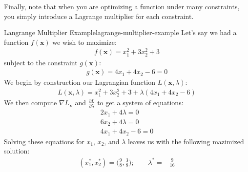 
Finally, note that when you are optimizing a function under many constraints, you simply introduce a Lagrange multiplier for each constraint.

\begin{example}{Langrange Multiplier Example}{lagrange-multiplier-example}
	Let's say we had a function $f(\textbf{x})$ we wish to maximize:
	\begin{align*}
		f(\textbf{x}) = x_{1}^{2} + 3x_{2}^{2} + 3
	\end{align*}
	subject to the constraint $g(\textbf{x})$:
	\begin{align*}
		g(\textbf{x}) = 4x_{1} + 4x_{2} - 6 = 0
	\end{align*}
	We begin by construction our Lagrangian function $L(\textbf{x}, \lambda)$:
	\begin{align*}
		L(\textbf{x}, \lambda) = x_{1}^{2} + 3x_{2}^{2} + 3 + \lambda (4x_{1} + 4x_{2} - 6)
	\end{align*}
	We then compute $\nabla L_{\textbf{x}}$ and $\frac{\partial L}{\partial \lambda}$ to get a system of equations:
	\begin{align*}
		2x_{1} + 4\lambda = 0 \\
		6x_{2} + 4\lambda = 0 \\
		4x_{1} + 4x_{2} - 6 = 0
	\end{align*}
	Solving these equations for $x_{1}$, $x_{2}$, and $\lambda$ leaves us with the following mazimized solution:
	\begin{align*}
		(x_{1}^{*}, x_{2}^{*}) = \bigg(\frac{9}{8}, \frac{3}{8}\bigg); \qquad \lambda^{*} = -\frac{9}{16}
	\end{align*}
\end{example}

